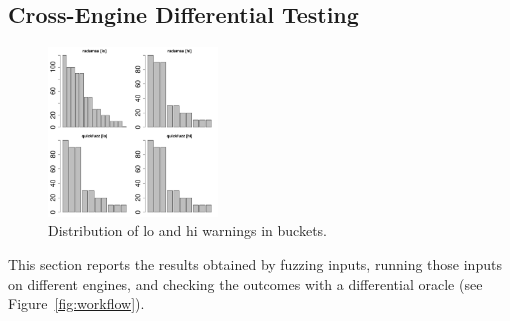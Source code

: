 \documentclass[10pt,conference,anonymous]{IEEEtran}
\begin{document}
\subsection{Cross-Engine Differential Testing}

\begin{figure}[t]
  \centering
  \includegraphics[trim=0 0 0 0,clip,width=0.40\textwidth]{R/histograms/histograms.pdf}  
  \caption{\label{fig:distribution}Distribution of lo and hi warnings
   in buckets.}
\end{figure}

This section reports the results obtained by fuzzing inputs, running
those inputs on different engines, and checking the outcomes with a
differential oracle (see Figure~\ref{fig:workflow}). 
\end{document}
